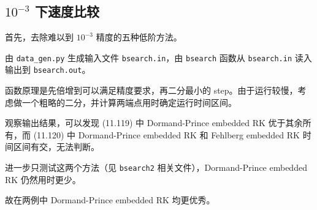 \documentclass[12pt]{ctexart}
\begin{document}
\subsection*{$10^{-3}$ 下速度比较}

首先，去除难以到 $10^{-3}$ 精度的五种低阶方法。

由 \texttt{data\_gen.py} 生成输入文件 \texttt{bsearch.in}，由 \texttt{bsearch} 函数从 \texttt{bsearch.in} 读入输出到 \texttt{bsearch.out}。

函数原理是先倍增到可以满足精度要求，再二分最小的 step。由于运行较慢，考虑做一个粗略的二分，并计算两端点用时确定运行时间区间。 

观察输出结果，可以发现 (11.119) 中 Dormand-Prince embedded RK 优于其余所有，而 (11.120) 中 Dormand-Prince embedded RK 和 Fehlberg embedded RK 时间区间有交，无法判断。

进一步只测试这两个方法（见 \texttt{bsearch2} 相关文件），Dormand-Prince embedded RK 仍然用时更少。

故在两例中 Dormand-Prince embedded RK 均更优秀。
\end{document}
